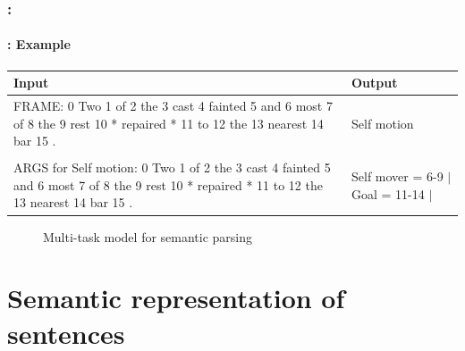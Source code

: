 \documentclass[xcolor=table]{beamer}
\begin{document}
\begin{frame}
	\frametitle{\insertshortsubtitle: \insertsection}
	\framesubtitle{\insertsubsection: Example \cite{2020-kalyanpur}}
	
	\begin{minipage}{.58\textwidth}
		\small
		\begin{tabular}{|p{4cm}|p{2cm}|}
			\hline
			Input & Output \\
			\hline
			FRAME: 0 Two 1 of 2 the 3 cast 4
			fainted 5 and 6 most 7 of 8 the 9 rest
			10 * repaired * 11 to 12 the 13 nearest
			14 bar 15 . & Self motion\\
			&\\
			ARGS for Self motion: 0 Two 1 of 2 the
			3 cast 4 fainted 5 and 6 most 7 of 8 the
			9 rest 10 * repaired * 11 to 12 the 13
			nearest 14 bar 15 . & Self mover = 6-9 $|$ Goal = 11-14 $|$\\
			\hline
		\end{tabular}
	\end{minipage}
	\begin{minipage}{.4\textwidth}
		\begin{figure}
			\caption{Multi-task model for semantic parsing \cite{2020-kalyanpur}}
		\end{figure}
	\end{minipage}
	
\end{frame}

\section{Semantic representation of sentences}
\end{document}
